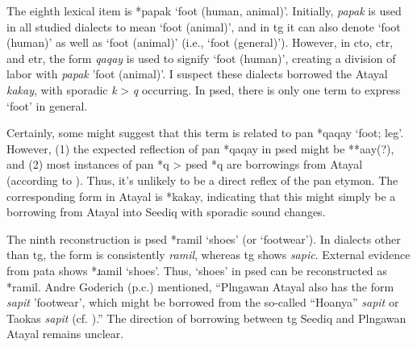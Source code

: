 The eighth lexical item is *papak `foot (human, animal)'. Initially, \textit{papak} is used in all studied dialects to mean `foot (animal)', and in \acl{tg} it can also denote `foot (human)' as well as `foot (animal)' (i.e., `foot (general)'). However, in \acl{cto}, \acl{ctr}, and \acl{etr}, the form \textit{qaqay} is used to signify `foot (human)', creating a division of labor with \textit{papak} 'foot (animal)'. I suspect these dialects borrowed the Atayal \textit{kakay}, with sporadic \textit{k} > \textit{q} occurring. In \acl{psed}, there is only one term to express `foot' in general.


Certainly, some might suggest that this term is related to \acl{pan} *qaqay `foot; leg'. However, (1) the expected reflection of \acs{pan} *qaqay in \acl{psed} might be **aay(?), and (2) most instances of \acs{pan} *q > \acs{psed} *q are borrowings from Atayal (according to \textcite{song2024sedq}). Thus, it's unlikely to be a direct reflex of the \acs{pan} etymon. The corresponding form in Atayal is *kakay, indicating that this might simply be a borrowing from Atayal into Seediq with sporadic sound changes.


The ninth reconstruction is \acl{psed} *ramil `shoes' (or `footwear'). In dialects other than \acl{tg}, the form is consistently \textit{ramil}, whereas \acl{tg} shows \textit{sapic}. External evidence from \acl{pata} shows *ɹamil `shoes'. Thus, `shoes' in \acl{psed} can be reconstructed as *ramil. Andre Goderich (p.c.) mentioned, ``Plngawan Atayal also has the form \textit{sapit} 'footwear', which might be borrowed from the so-called ``Hoanya'' \textit{sapit} or Taokas \textit{sapit} (cf. \cite[80]{tsuchida1982wp}).'' The direction of borrowing between \acl{tg} Seediq and Plngawan Atayal remains unclear.

